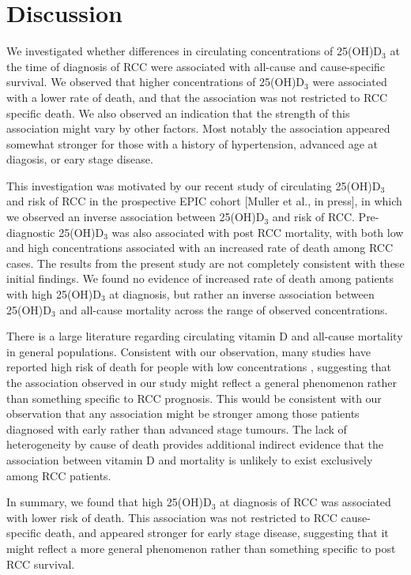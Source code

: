 \documentclass[a4paper,11pt]{article}
\begin{document}
\section*{Discussion}
We investigated whether differences in circulating concentrations of 
25(OH)D$_3$ at the time of diagnosis of RCC were associated with all-cause and 
cause-specific survival. We observed that higher concentrations of 25(OH)D$_3$ 
were associated with a lower rate of death, and that the 
association was not restricted to RCC specific death. We also observed an 
indication that the strength of this association might vary by other factors.
Most notably the association appeared somewhat stronger for those with a 
history of hypertension, advanced age at diagosis, or eary stage disease.

This investigation was motivated by our recent study of circulating 25(OH)D$_3$ 
and risk of RCC in the prospective EPIC cohort [Muller et al., in press], in 
which we observed an inverse association between 25(OH)D$_3$ and risk of RCC. 
Pre-diagnostic 25(OH)D$_3$ was also associated with post RCC mortality, with 
both low and high concentrations associated with an increased rate of death 
among RCC cases. The results from the present study are not completely 
consistent with these initial findings. We found no evidence of increased rate 
of death among patients with high 25(OH)D$_3$ at diagnosis, but rather an 
inverse association between 25(OH)D$_3$ and all-cause mortality across the 
range of observed concentrations.

There is a large literature regarding circulating vitamin D and all-cause 
mortality in general populations. Consistent with our observation, many studies 
have reported high risk of death for people with low concentrations 
\cite{schottker_strong_2013, virtanen_association_2011, hutchinson_low_2010, 
szulc_serum_2009, semba_low_2009, pilz_vitamin_2009, 
melamed_ml_25-hydroxyvitamin_2008, jia_nutritional_2007}, suggesting that 
the association observed in our study might reflect a general phenomenon rather 
than something specific to RCC prognosis. This would be consistent with our 
observation that any association might be stronger among those patients 
diagnosed with early rather than advanced stage tumours. The lack of 
heterogeneity by cause of death provides additional indirect evidence that the 
association between vitamin D and mortality is unlikely to exist exclusively 
among RCC patients. 

In summary, we found that high 25(OH)D$_3$ at diagnosis of RCC was associated 
with lower risk of death. This association was not restricted to RCC 
cause-specific death, and appeared stronger for early stage disease, suggesting 
that it might reflect a more general phenomenon rather than something 
specific to post RCC survival.  
\end{document}
